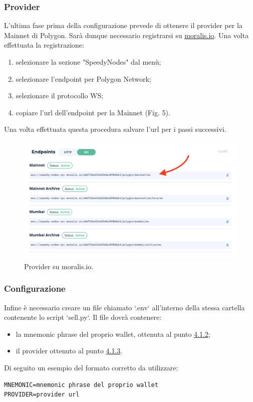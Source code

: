 \documentclass[a4paper, 12pt]{article}
\begin{document}
\subsubsection{Provider}
\label{sec:provider}
L'ultima fase prima della configurazione prevede di ottenere il provider per la Mainnet di Polygon.
Sarà dunque necessario registrarsi su \href{https://www.moralis.io}{moralis.io}. Una volta effettuata la registrazione:
\begin{enumerate}
  \item selezionare la sezione "SpeedyNodes" dal menù;
  \item selezionare l'endpoint per Polygon Network;
  \item selezionare il protocollo WS;
  \item copiare l'url dell'endpoint per la Mainnet (Fig. 5).
\end{enumerate}
Una volta effettuata questa procedura salvare l'url per i passi successivi.
\FloatBarrier
\begin{figure}[!h]
\centering
\includegraphics[width=0.7\linewidth]{img/moralis.png}
\caption{Provider su moralis.io.}
\end{figure}
\FloatBarrier
\subsubsection{Configurazione}
Infine è necessario creare un file chiamato `.env` all'interno della stessa cartella contenente lo script `sell.py`. Il file dovrà contenere:
\begin{itemize}
  \item la mnemonic phrase del proprio wallet, ottenuta al punto \hyperref[sec:mnemonic]{4.1.2};
  \item il provider ottenuto al punto \hyperref[sec:provider]{4.1.3}.
\end{itemize}
Di seguito un esempio del formato corretto da utilizzare:
\begin{verbatim}
MNEMONIC=mnemonic phrase del proprio wallet
PROVIDER=provider url
\end{verbatim}
\end{document}
